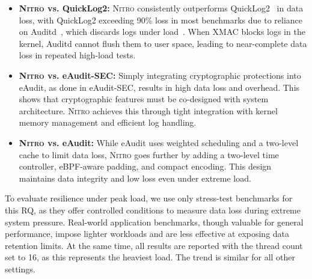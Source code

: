 \documentclass[sigconf]{sty/acmart}
\newcommand{\Sys}{\mbox{\textsc{Nitro}}\xspace}
\newcommand{\qltwo}{QuickLog2\xspace}
\newcommand{\ed}{eAudit\xspace}
\newcommand{\edm}{eAudit-SEC\xspace}
\begin{document}
\begin{itemize}[leftmargin=*,noitemsep,topsep=0pt]
    \item \textbf{\Sys vs. \qltwo:} \Sys consistently outperforms \qltwo~\cite{281386} in data loss, with \qltwo exceeding 90\% loss in most benchmarks due to reliance on Auditd~\cite{linuxaudit}, which discards logs under load~\cite{Sekar2023eAA, nodrop}. When XMAC blocks logs in the kernel, Auditd cannot flush them to user space, leading to near-complete data loss in repeated high-load tests.

    \item \textbf{\Sys vs. \edm:} Simply integrating cryptographic protections into \ed, as done in \edm, results in high data loss and overhead. This shows that cryptographic features must be co-designed with system architecture. \Sys achieves this through tight integration with kernel memory management and efficient log handling.

    \item \textbf{\Sys vs. \ed:} While \ed uses weighted scheduling and a two-level cache to limit data loss, \Sys goes further by adding a two-level time controller, eBPF-aware padding, and compact encoding. This design maintains data integrity and low loss even under extreme load.
\end{itemize}
To evaluate resilience under peak load, we use only stress-test benchmarks for this RQ, as they offer controlled conditions to measure data loss during extreme system pressure. Real-world application benchmarks, though valuable for general performance, impose lighter workloads and are less effective at exposing data retention limits. At the same time, all results are reported with the thread count set to 16, as this represents the heaviest load. The trend is similar for all other settings.
\end{document}
